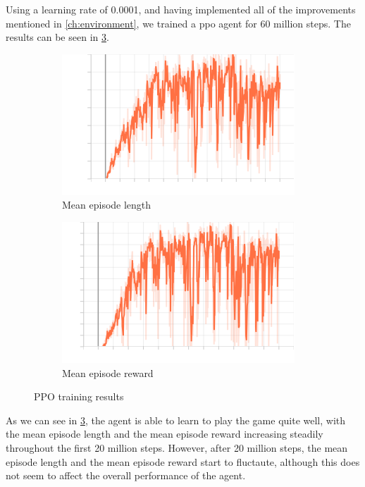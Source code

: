 Using a learning rate of 0.0001, and having implemented all of the
improvements mentioned in \cref{ch:environment}, we trained a \gls{ppo} agent
for 60 million steps. The results can be seen in \cref{fig:ppo}.

\begin{figure}[H]
    \begin{subfigure}{0.45\textwidth}
        \centering
        \includegraphics[width=\textwidth]{img/ppo_len_mean.png}
        \caption{Mean episode length}
        \label{fig:ppo_len_mean}
    \end{subfigure}
    \begin{subfigure}{0.45\textwidth}
        \centering
        \includegraphics[width=\textwidth]{img/ppo_rew_mean.png}
        \caption{Mean episode reward}
        \label{fig:ppo_reward_mean}
    \end{subfigure}
    \caption{PPO training results}
    \label{fig:ppo}
\end{figure}

As we can see in \cref{fig:ppo}, the agent is able to learn to play the game
quite well, with the mean episode length and the mean episode reward increasing
steadily throughout the first 20 million steps. However, after 20 million steps,
the mean episode length and the mean episode reward start to fluctaute,
although this does not seem to affect the overall performance of the agent.

